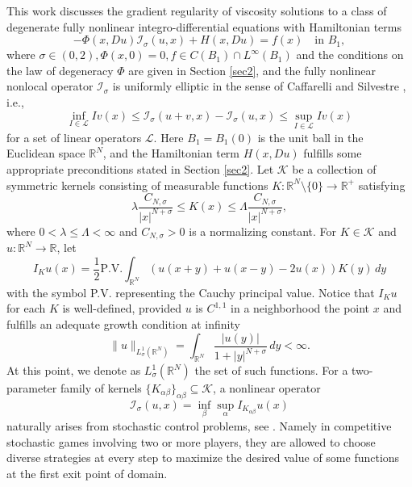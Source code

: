 \documentclass[11pt,reqno]{amsart}
\numberwithin{equation}{section}
\begin{document}
This work discusses the gradient regularity of viscosity solutions to a class of degenerate fully nonlinear integro-differential equations with Hamiltonian terms
\begin{equation}
\label{main}
-\Phi(x,Du)\mathcal{I}_\sigma(u,x)+H(x,Du)=f(x) \quad\text{in }  B_1,%
\end{equation}
where $\sigma\in (0,2), \Phi(x,0)=0, f\in C(B_1)\cap L^\infty(B_1)$ and the conditions on the law of degeneracy $\Phi$ are given in Section \ref{sec2}, and the fully nonlinear nonlocal operator $\mathcal{I}_\sigma$ is uniformly elliptic in the sense of Caffarelli and Silvestre \cite{CS09,CS11}, i.e.,
$$
\inf_{I\in\mathcal{L}}Iv(x)\le \mathcal{I}_\sigma(u+v,x)-\mathcal{I}_\sigma (u,x)\le\sup_{I\in\mathcal{L}}Iv(x)
$$
for a set of linear operators $\mathcal{L}$. Here $B_1=B_1(0)$ is the unit ball in the Euclidean space $\mathbb{R}^N$, and the Hamiltonian term $H(x,Du)$ fulfills some appropriate preconditions stated in Section \ref{sec2}. Let $\mathcal{K}$ be a collection of symmetric kernels consisting of measurable functions $K:\mathbb{R}^N\setminus\{0\}\rightarrow\mathbb{R}^+$ satisfying
$$
\lambda\frac{C_{N,\sigma}}{|x|^{N+\sigma}}\le K(x)\le \Lambda\frac{C_{N,\sigma}}{|x|^{N+\sigma}},
$$
where $0<\lambda\le\Lambda<\infty$ and $C_{N,\sigma}>0$ is a normalizing constant. %
For $K\in \mathcal{K}$ and $u:\mathbb{R}^N\rightarrow\mathbb{R}$, let
$$
I_Ku(x)=\frac{1}{2}\mathrm{P.V.}\int_{\mathbb{R}^N}(u(x+y)+u(x-y)-2u(x))K(y)\,dy
$$
with the symbol P.V. representing the Cauchy principal value. Notice that $I_Ku$ for each $K$ is well-defined, provided $u$ is $C^{1,1}$ in a neighborhood the point $x$ and fulfills an adequate growth condition at infinity
$$
\|u\|_{L^1_\sigma(\mathbb{R}^N)}=\int_{\mathbb{R}^N}\frac{|u(y)|}{1+|y|^{N+\sigma}}\,dy<\infty.
$$
At this point, we denote as $L^1_\sigma(\mathbb{R}^N)$ the set of such functions. For a two-parameter family of kernels $\{K_{\alpha\beta}\}_{\alpha\beta}\subseteq\mathcal{K}$,
a nonlinear operator
$$
\mathcal{I}_\sigma (u,x)=\inf_\beta\sup_\alpha I_{K_{\alpha\beta}}u(x)
$$
naturally arises from stochastic control problems, see \cite{Soner}. Namely in competitive stochastic games involving two or more players, they are allowed to choose diverse strategies at every step to maximize the desired value of some functions at the first exit point of domain. %
\end{document}

